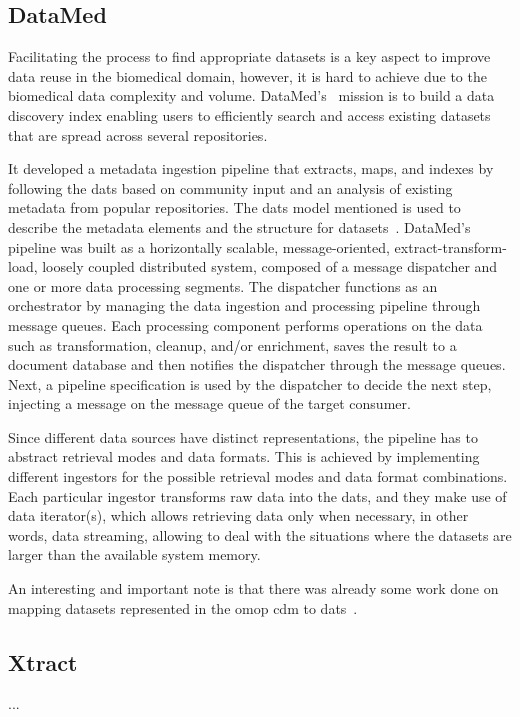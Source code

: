 \subsection*{DataMed}
Facilitating the process to find appropriate datasets is a key aspect to improve data reuse in the biomedical domain, however, it is hard to achieve due to the biomedical data complexity and volume.
DataMed's~\cite{datamed} mission is to build a data discovery index enabling users to efficiently search and access existing datasets that are spread across several repositories.

It developed a metadata ingestion pipeline that extracts, maps, and indexes by following the \gls{dats} based on community input and an analysis of existing metadata from popular repositories.
The \gls{dats} model mentioned is used to describe the metadata elements and the structure for datasets~\cite{dats}.
DataMed's pipeline was built as a horizontally scalable, message-oriented, extract-transform-load, loosely coupled distributed system, composed of a message dispatcher and one or more data processing segments.
The dispatcher functions as an orchestrator by managing the data ingestion and processing pipeline through message queues.
Each processing component performs operations on the data such as transformation, cleanup, and/or enrichment, saves the result to a document database and then notifies the dispatcher through the message queues.
Next, a pipeline specification is used by the dispatcher to decide the next step, injecting a message on the message queue of the target consumer.

Since different data sources have distinct representations, the pipeline has to abstract retrieval modes and data formats.
This is achieved by implementing different ingestors for the possible retrieval modes and data format combinations.
Each particular ingestor transforms raw data into the \gls{dats}, and they make use of data iterator(s), which allows retrieving data only when necessary, in other words, data streaming, allowing to deal with the situations where the datasets are larger than the available system memory.

An interesting and important note is that there was already some work done on mapping datasets represented in the \gls{omop} \gls{cdm} to \gls{dats}~\cite{cdm-dats}.

\subsection*{Xtract}
...

